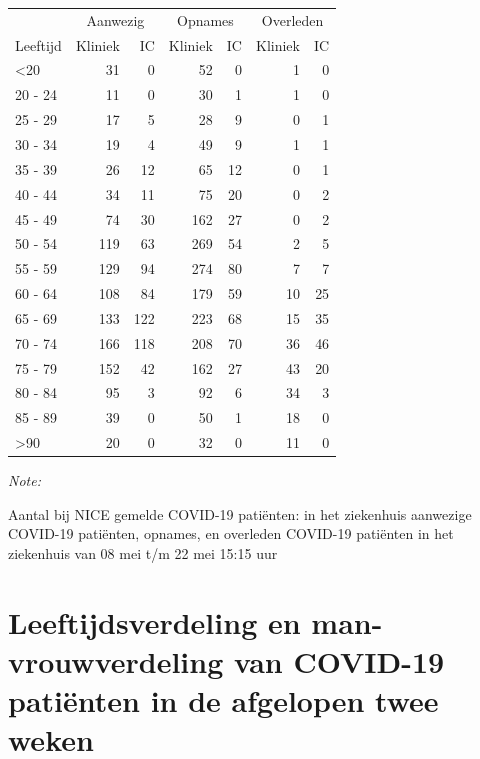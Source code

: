 \documentclass[
  english,
  man,floatsintext]{apa6}
\begin{document}
\begin{table}
\centering\begingroup\fontsize{10}{12}\selectfont

\begin{threeparttable}
\begin{tabular}{lrrrrrr}
\toprule
\multicolumn{1}{c}{ } & \multicolumn{2}{c}{Aanwezig} & \multicolumn{2}{c}{Opnames} & \multicolumn{2}{c}{Overleden} \\
\cmidrule(l{3pt}r{3pt}){2-3} \cmidrule(l{3pt}r{3pt}){4-5} \cmidrule(l{3pt}r{3pt}){6-7}
Leeftijd & Kliniek & IC & Kliniek & IC & Kliniek & IC\\
\midrule
<20 & 31 & 0 & 52 & 0 & 1 & 0\\
20 - 24 & 11 & 0 & 30 & 1 & 1 & 0\\
25 - 29 & 17 & 5 & 28 & 9 & 0 & 1\\
30 - 34 & 19 & 4 & 49 & 9 & 1 & 1\\
35 - 39 & 26 & 12 & 65 & 12 & 0 & 1\\
40 - 44 & 34 & 11 & 75 & 20 & 0 & 2\\
45 - 49 & 74 & 30 & 162 & 27 & 0 & 2\\
50 - 54 & 119 & 63 & 269 & 54 & 2 & 5\\
55 - 59 & 129 & 94 & 274 & 80 & 7 & 7\\
60 - 64 & 108 & 84 & 179 & 59 & 10 & 25\\
65 - 69 & 133 & 122 & 223 & 68 & 15 & 35\\
70 - 74 & 166 & 118 & 208 & 70 & 36 & 46\\
75 - 79 & 152 & 42 & 162 & 27 & 43 & 20\\
80 - 84 & 95 & 3 & 92 & 6 & 34 & 3\\
85 - 89 & 39 & 0 & 50 & 1 & 18 & 0\\
>90 & 20 & 0 & 32 & 0 & 11 & 0\\
\bottomrule
\end{tabular}
\begin{tablenotes}
\item \textit{Note: } 
\item Aantal bij NICE gemelde COVID-19 patiënten: in het ziekenhuis aanwezige COVID-19 patiënten, opnames, en overleden COVID-19 patiënten in het ziekenhuis van 08 mei t/m 22 mei 15:15 uur
\end{tablenotes}
\end{threeparttable}
\endgroup{}
\end{table}

\newpage

\hypertarget{leeftijdsverdeling-en-man-vrouwverdeling-van-covid-19-patiuxebnten-in-de-afgelopen-twee-weken}{%
\section{Leeftijdsverdeling en man-vrouwverdeling van COVID-19 patiënten in de afgelopen twee weken}\label{leeftijdsverdeling-en-man-vrouwverdeling-van-covid-19-patiuxebnten-in-de-afgelopen-twee-weken}}
\end{document}
